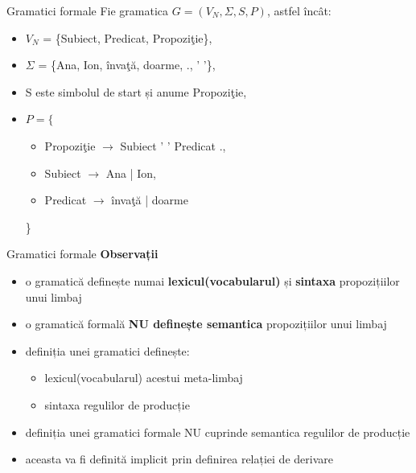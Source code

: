 \documentclass[pdf]{beamer}
\begin{document}
\begin{frame}{Gramatici formale}
Fie gramatica $G = (V_{N}, \Sigma, S, P)$, astfel încât:

\begin{itemize}
\item
$V_{N}$ = \{Subiect, Predicat, Propoziţie\},
\item
$\Sigma$ = \{Ana, Ion, învaţă, doarme, ., ' '\},
\item
S este simbolul de start și anume Propoziţie,
\item
$P = \{$
\begin{itemize}
\item
Propoziţie $\rightarrow$ Subiect ' ' Predicat .,
\item
Subiect $\rightarrow$ Ana | Ion,
\item
Predicat $\rightarrow$ învaţă | doarme
\end{itemize}
\}
\end{itemize}
\end{frame}



\begin{frame}{Gramatici formale}
\textbf{Observații}
\begin{itemize}
\item
o gramatică definește numai \textbf{lexicul(vocabularul)} și \textbf{sintaxa} propozițiilor unui limbaj
\item
o gramatică formală \textbf{NU definește semantica} propozițiilor unui limbaj
\item
definiția unei gramatici definește:
\begin{itemize}
\item
lexicul(vocabularul) acestui meta-limbaj
\item
sintaxa regulilor de producție
\end{itemize}
\item
definiția unei gramatici formale NU cuprinde semantica regulilor de producție
\item
aceasta va fi definită implicit prin definirea relației de derivare
\end{itemize}
\end{frame}
\end{document}
